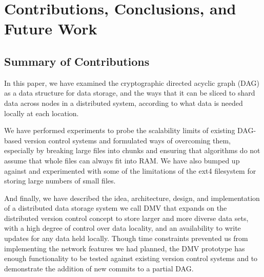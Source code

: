 \chapter{Contributions, Conclusions, and Future Work}


\section{Summary of Contributions}

In this paper, we have examined the cryptographic directed acyclic graph (DAG)
as a data structure for data storage, and the ways that it can be sliced to
shard data across nodes in a distributed system, according to what data is
needed locally at each location.

We have performed experiments to probe the scalability limits of existing
DAG-based version control systems and formulated ways of overcoming them,
especially by breaking large files into chunks and ensuring that algorithms do
not assume that whole files can always fit into RAM. We have also bumped up
against and experimented with some of the limitations of the ext4 filesystem for
storing large numbers of small files.

And finally, we have described the idea, architecture, design, and
implementation of a distributed data storage system we call \gls{DMV} that
expands on the distributed version control concept to store larger and more
diverse data sets, with a high degree of control over data locality, and an
availability to write updates for any data held locally. Though time constraints
prevented us from implementing the network features we had planned, the
\gls{DMV} prototype has enough functionality to be tested against existing
version control systems and to demonstrate the addition of new \glspl{commit} to
a partial DAG.
